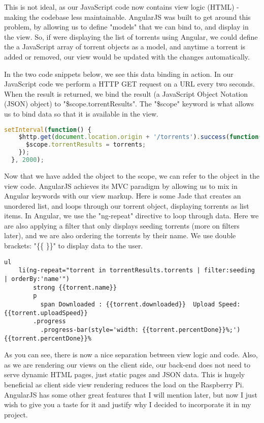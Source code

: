 This is not ideal, as our JavaScript code now contains view logic (HTML) - making the codebase less maintainable. AngularJS was built to get around this problem, by allowing us to define "models" that we can bind to, and display in the view. So, if were displaying the list of torrents using Angular, we could define the a JavaScript array of torrent objects as a model, and anytime a torrent is added or removed, our view would be updated with the changes automatically. 

In the two code snippets below, we see this data binding in action. In our JavaScript code we perform a HTTP GET request on a URL every two seconds. When the result is returned, we bind the result (a JavaScript Object Notation (JSON) object) to "\$scope.torrentResults". The "\$scope" keyword is what allows us to bind data so that it is available in the view.

\vspace{20px}
\begin{lstlisting}[caption=AngularJS binding data with \$scope keyword, language=JavaScript]
  setInterval(function() {
    $http.get(document.location.origin + '/torrents').success(function(torrents) {
      $scope.torrentResults = torrents;
    });
  }, 2000);
\end{lstlisting}


Now that we have added the object to the scope, we can refer to the object in the view code. AngularJS achieves its MVC paradigm by allowing us to mix in Angular keywords with our view markup. Here is some Jade that creates an unordered list, and loops through our torrent object, displaying torrents as list items. In Angular, we use the "ng-repeat" directive to loop through data. Here we are also applying a filter that only displays seeding torrents (more on filters later), and we are also ordering the torrents by their name. We use double brackets: "\{\{ \}\}" to display data to the user.

\vspace{20px}
\begin{lstlisting}[caption=Jade with AngularJS]
 ul
 	li(ng-repeat="torrent in torrentResults.torrents | filter:seeding | orderBy:'name'")
    	strong {{torrent.name}}
        p
          span Downloaded : {{torrent.downloaded}}  Upload Speed: {{torrent.uploadSpeed}}
        .progress
          .progress-bar(style='width: {{torrent.percentDone}}%;') {{torrent.percentDone}}%
\end{lstlisting}


As you can see, there is now a nice separation between view logic and code. Also, as we are rendering our views on the client side, our back-end does not need to serve dynamic HTML pages, just static pages and JSON data. This is hugely beneficial as client side view rendering reduces the load on the Raspberry Pi. AngularJS has some other great features that I will mention later, but now I just wish to give you a taste for it and justify why I decided to incorporate it in my project.


